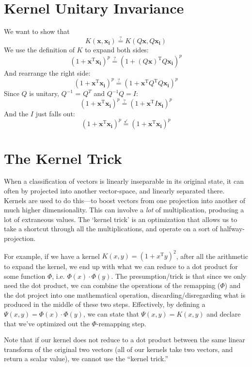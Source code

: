 \documentclass[11pt]{report}
\begin{document}
\section{Kernel Unitary Invariance}

We want to show that 
\[
  K(\mathbf{x}, \mathbf{x_i}) \overset{?}{=} K(Q\mathbf{x}, Q\mathbf{x_i})
\]
We use the definition of $K$ to expand both sides:
\[
  (1 + \mathbf{x}^\text{T}\mathbf{x_i})^p \overset{?}{=}
  (1 + (Q\mathbf{x})^\text{T}Q\mathbf{x_i})^p
\]
And rearrange the right side:
\[
  (1 + \mathbf{x}^\text{T}\mathbf{x_i})^p \overset{?}{=}
  (1 + \mathbf{x}^\text{T}Q^\text{T}Q\mathbf{x_i})^p
\]
Since $Q$ is unitary, $Q^{-1}$ = $Q^T$ and $Q^{-1}Q = I$:
\[
  (1 + \mathbf{x}^\text{T}\mathbf{x_i})^p \overset{?}{=}
  (1 + \mathbf{x}^\text{T}I\mathbf{x_i})^p
\]
And the $I$ just falls out:
\[
  (1 + \mathbf{x}^\text{T}\mathbf{x_i})^p \overset{\checkmark}{=}
  (1 + \mathbf{x}^\text{T}\mathbf{x_i})^p
\]



\section{The Kernel Trick}

When a classification of vectors is linearly inseparable in its original state, it can often by projected into another vector-space, and linearly separated there.
Kernels are used to do this---to boost vectors from one projection into another of much higher dimensionality. This can involve a \emph{lot} of multiplication, producing a lot of extraneous values.
The `kernel trick' is an optimization that allows us to take a shortcut through all the multiplications, and operate on a sort of halfway-projection.

For example, if we have a kernel $K(x,y) = (1 + x^\text{T}y)^2$, after all the arithmetic to expand the kernel, we end up with what we can reduce to a dot product for some function $\Phi$, i.e. $\Phi(x) \cdot \Phi(y)$.
The presumption/trick is that since we only need the dot product, we can combine the operations of the remapping ($\Phi$) and the dot project into one mathematical operation, discarding/disregarding what is produced in the middle of these two steps. Effectively, by defining a $\Psi(x, y) = \Phi(x) \cdot \Phi(y)$, we can state that $\Psi(x, y) = K(x, y)$ and declare that we've optimized out the $\Phi$-remapping step.

Note that if our kernel does not reduce to a dot product between the same linear transform of the original two vectors (all of our kernels take two vectors, and return a scalar value), we cannot use the ``kernel trick.''





\end{document}
